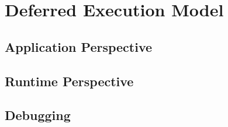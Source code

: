 
\chapter{Deferred Execution Model}
\label{chapter:deferred}

\section{Application Perspective}
\label{sec:deferredapp}

\section{Runtime Perspective}
\label{sec:deferredrt}

\section{Debugging}
\label{sec:debugging}

